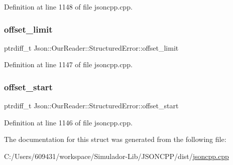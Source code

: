 Definition at line 1148 of file jsoncpp.\+cpp.

\hypertarget{struct_json_1_1_our_reader_1_1_structured_error_a15491a751a39c5153af04e68b1d0abb9}{}\label{struct_json_1_1_our_reader_1_1_structured_error_a15491a751a39c5153af04e68b1d0abb9} 
\subsubsection{\texorpdfstring{offset\+\_\+limit}{offset\_limit}}
{\footnotesize\ttfamily ptrdiff\+\_\+t Json\+::\+Our\+Reader\+::\+Structured\+Error\+::offset\+\_\+limit}



Definition at line 1147 of file jsoncpp.\+cpp.

\hypertarget{struct_json_1_1_our_reader_1_1_structured_error_a102677698afb8177c985e72dafe72b15}{}\label{struct_json_1_1_our_reader_1_1_structured_error_a102677698afb8177c985e72dafe72b15} 
\subsubsection{\texorpdfstring{offset\+\_\+start}{offset\_start}}
{\footnotesize\ttfamily ptrdiff\+\_\+t Json\+::\+Our\+Reader\+::\+Structured\+Error\+::offset\+\_\+start}



Definition at line 1146 of file jsoncpp.\+cpp.



The documentation for this struct was generated from the following file\+:\begin{DoxyCompactItemize}
\item 
C\+:/\+Users/609431/workspace/\+Simulador-\/\+Lib/\+J\+S\+O\+N\+C\+P\+P/dist/\hyperlink{jsoncpp_8cpp}{jsoncpp.\+cpp}\end{DoxyCompactItemize}
